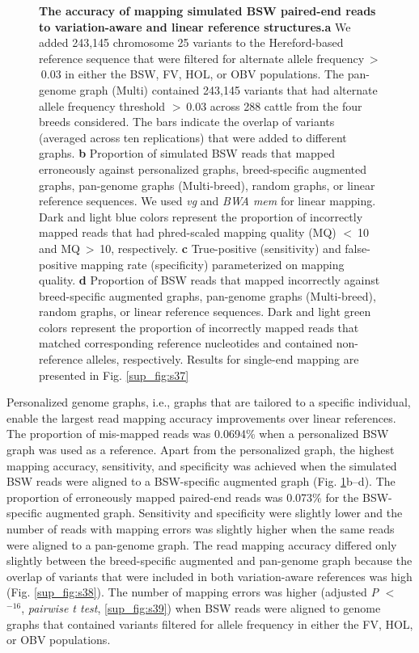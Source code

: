 \documentclass[../main.tex]{subfiles}
\begin{document}
\begin{figure}[!htb]
    \centering
    \caption[Read mapping across cattle graphs combination]{\textbf{The accuracy of mapping simulated BSW paired-end reads to variation-aware and linear reference structures.}\small{\textbf{a} We added 243,145 chromosome 25 variants to the Hereford-based reference sequence that were filtered for alternate allele frequency $>$ 0.03 in either the BSW, FV, HOL, or OBV populations. The pan-genome graph (Multi) contained 243,145 variants that had alternate allele frequency threshold $>$ 0.03 across 288 cattle from the four breeds considered. The bars indicate the overlap of variants (averaged across ten replications) that were added to different graphs. \textbf{b} Proportion of simulated BSW reads that mapped erroneously against personalized graphs, breed-specific augmented graphs, pan-genome graphs (Multi-breed), random graphs, or linear reference sequences. We used \emph{vg} and \emph{BWA mem} for linear mapping. Dark and light blue colors represent the proportion of incorrectly mapped reads that had phred-scaled mapping quality (MQ) $<$ 10 and MQ $>$ 10, respectively. \textbf{c} True-positive (sensitivity) and false-positive mapping rate (specificity) parameterized on mapping quality. \textbf{d} Proportion of BSW reads that mapped incorrectly against breed-specific augmented graphs, pan-genome graphs (Multi-breed), random graphs, or linear reference sequences. Dark and light green colors represent the proportion of incorrectly mapped reads that matched corresponding reference nucleotides and contained non-reference alleles, respectively. Results for single-end mapping are presented in Fig. \ref{sup_fig:s37}}}
    \label{fig34:breed}
\end{figure}


Personalized genome graphs, i.e., graphs that are tailored to a specific individual, enable the largest read mapping accuracy improvements over linear references. The proportion of mis-mapped reads was 0.0694\% when a personalized BSW graph was used as a reference. Apart from the personalized graph, the highest mapping accuracy, sensitivity, and specificity was achieved when the simulated BSW reads were aligned to a BSW-specific augmented graph (Fig. \ref{fig34:breed}b–d). The proportion of erroneously mapped paired-end reads was 0.073\% for the BSW-specific augmented graph. Sensitivity and specificity were slightly lower and the number of reads with mapping errors was slightly higher when the same reads were aligned to a pan-genome graph. The read mapping accuracy differed only slightly between the breed-specific augmented and pan-genome graph because the overlap of variants that were included in both variation-aware references was high (Fig. \ref{sup_fig:s38}). The number of mapping errors was higher (adjusted \emph{P} $<$ $^{−16}$, \emph{pairwise t test}, \ref{sup_fig:s39}) when BSW reads were aligned to genome graphs that contained variants filtered for allele frequency in either the FV, HOL, or OBV populations.
\end{document}
